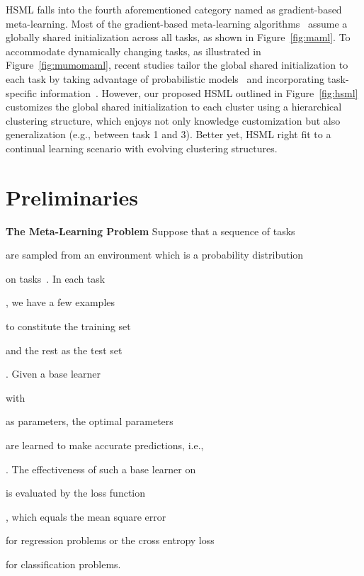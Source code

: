 \documentclass{article}
\begin{document}
HSML falls into the fourth aforementioned category named as gradient-based meta-learning.
Most of the gradient-based meta-learning algorithms~\cite{finn2017model,li2017meta,flennerhag2018transferring} assume a globally shared initialization across all tasks, as shown in Figure~\ref{fig:maml}. 
To accommodate dynamically changing tasks, as illustrated in Figure~\ref{fig:mumomaml}, recent  
studies tailor the global shared initialization to each task by taking advantage of 
probabilistic models~\cite{finn2018probabilistic,grant2018recasting,yoon2018bayesian} and 
incorporating task-specific information~\cite{lee2018gradient,vuorio2018toward}. However, our proposed HSML outlined in Figure~\ref{fig:hsml} customizes the global shared initialization to each cluster using a hierarchical clustering structure, which enjoys not only knowledge customization but also generalization (e.g., between task 1 and 3).
Better yet, HSML right fit to a continual learning scenario with evolving clustering structures. \section{Preliminaries}
\label{sec:preliminaries}
\textbf{The Meta-Learning Problem} 
Suppose that a sequence of tasks \begin{small}\end{small} are sampled from an environment which is a probability distribution \begin{small}\end{small} on tasks~\cite{baxter1998theoretical}.
In each task \begin{small}\end{small}, we have a few examples \begin{small}
\end{small}
to constitute the training set \begin{small}\end{small}
and the rest as the test set \begin{small}\end{small}.
Given a base learner \begin{small}\end{small} with  \begin{small}\end{small} as parameters, 
the optimal parameters \begin{small}

\end{small} are learned to make accurate predictions, i.e., \begin{small}\end{small}.
The effectiveness of such a base learner 
on \begin{small}\end{small} is evaluated by the loss function  \begin{small}\end{small}, 
which equals the mean square error \begin{small}\end{small} for regression problems or the cross entropy loss
\begin{small}\end{small} for classification problems.   
\end{document}
